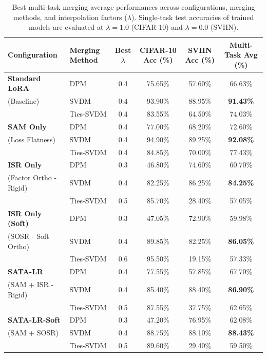 \documentclass{article}
\begin{document}
\begin{table}[t]
\caption{Best multi-task merging average performances across configurations, merging methods, and interpolation factors ($\lambda$). Single-task test accuracies of trained models are evaluated at $\lambda=1.0$ (CIFAR-10) and $\lambda=0.0$ (SVHN).}
\label{tab:merging_results}
\vskip 0.15in
\begin{center}
\begin{small}
\begin{sc}
\begin{tabular}{llcccc}
\toprule
Configuration & Merging Method & Best $\lambda$ & CIFAR-10 Acc (\%) & SVHN Acc (\%) & Multi-Task Avg (\%) \\
\midrule
\textbf{Standard LoRA} & DPM & 0.4 & 75.65\% & 57.60\% & 66.63\% \\
(Baseline) & SVDM & 0.4 & 93.90\% & 88.95\% & \textbf{91.43\%} \\
& Ties-SVDM & 0.4 & 83.55\% & 64.50\% & 74.03\% \\
\midrule
\textbf{SAM Only} & DPM & 0.4 & 77.00\% & 68.20\% & 72.60\% \\
(Loss Flatness) & SVDM & 0.4 & 94.90\% & 89.25\% & \textbf{92.08\%} \\
& Ties-SVDM & 0.4 & 84.85\% & 70.00\% & 77.43\% \\
\midrule
\textbf{ISR Only} & DPM & 0.3 & 46.80\% & 74.60\% & 60.70\% \\
(Factor Ortho - Rigid) & SVDM & 0.4 & 82.25\% & 86.25\% & \textbf{84.25\%} \\
& Ties-SVDM & 0.5 & 85.70\% & 28.40\% & 57.05\% \\
\midrule
\textbf{ISR Only (Soft)} & DPM & 0.3 & 47.05\% & 72.90\% & 59.98\% \\
(SOSR - Soft Ortho) & SVDM & 0.4 & 89.85\% & 82.25\% & \textbf{86.05\%} \\
& Ties-SVDM & 0.6 & 95.50\% & 19.15\% & 57.33\% \\
\midrule
\textbf{SATA-LR} & DPM & 0.4 & 77.55\% & 57.85\% & 67.70\% \\
(SAM + ISR - Rigid) & SVDM & 0.4 & 85.40\% & 88.40\% & \textbf{86.90\%} \\
& Ties-SVDM & 0.5 & 87.55\% & 37.75\% & 62.65\% \\
\midrule
\textbf{SATA-LR-Soft} & DPM & 0.3 & 47.20\% & 76.95\% & 62.08\% \\
(SAM + SOSR) & SVDM & 0.4 & 88.75\% & 88.10\% & \textbf{88.43\%} \\
& Ties-SVDM & 0.5 & 89.60\% & 29.40\% & 59.50\% \\
\bottomrule
\end{tabular}
\end{sc}
\end{small}
\end{center}
\vskip -0.1in
\end{table}
\end{document}
